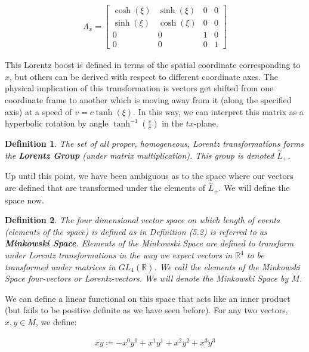 \documentclass[10pt]{ucthesis}
\newcommand{\R}{\mathbb{R}}
\newtheorem{definition}{Definition}[chapter]
\begin{document}
\begin{equation}
\begin{aligned}
	\Lambda_x = \begin{bmatrix}
						\cosh(\xi) & \sinh(\xi) & 0 & 0 \\
						\sinh(\xi) & \cosh(\xi) & 0 & 0 \\
						0&0&1&0\\
						0&0&0&1
					\end{bmatrix}
\end{aligned}
\end{equation}

This Lorentz boost is defined in terms of the spatial coordinate corresponding to $x$, but others can be derived with respect to different coordinate axes. The physical implication of this transformation is vectors get shifted from one coordinate frame to another which is moving away from it (along the specified axis) at a speed of $v=c\tanh(\xi)$. In this way, we can interpret this matrix as a hyperbolic rotation by angle $\tanh^{-1}(\frac{v}{c})$ in the $tx$-plane.

\begin{definition}
	The set of all proper, homogeneous, Lorentz transformations forms the \textbf{Lorentz Group} (under matrix multiplication). This group is denoted $\overset{\sim}{L}_+$.
\end{definition}

Up until this point, we have been ambiguous as to the space where our vectors are defined that are transformed under the elements of $\overset{\sim}{L}_+$. We will define the space now.

\begin{definition}
	The four dimensional vector space on which length of events (elements of the space) is defined as in Definition (5.2) is referred to as \textbf{Minkowski Space}. Elements of the Minkowski Space are defined to transform under Lorentz transformations in the way we expect vectors in $\R^4$ to be transformed under matrices in $GL_4(\R)$. We call the elements of the Minkowski Space four-vectors or Lorentz-vectors. We will denote the Minkowski Space by $M$.
\end{definition}


We can define a linear functional on this space that acts like an inner product (but fails to be positive definite as we have seen before). For any two vectors, $x,y\in M$, we define:

\begin{equation}
\begin{aligned}
	x\dot y \coloneq -x^0y^0 + x^1y^1 + x^2y^2 + x^3y^3
\end{aligned}
\end{equation}
\end{document}
